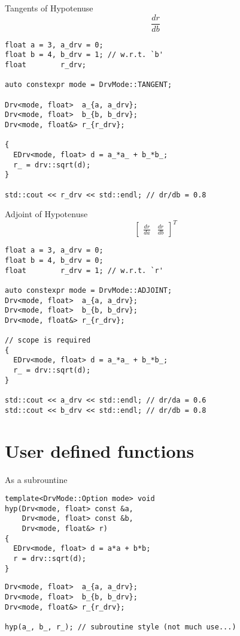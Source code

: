 \documentclass[xcolor=dvipsnames]{beamer}
\begin{document}
\begin{frame}[fragile]{Tangents of Hypotenuse}
\begin{equation*}
  \frac{d r}{d b}
\end{equation*}

\begin{lstlisting}
float a = 3, a_drv = 0;
float b = 4, b_drv = 1; // w.r.t. `b'
float        r_drv;

auto constexpr mode = DrvMode::TANGENT;

Drv<mode, float>  a_{a, a_drv};
Drv<mode, float>  b_{b, b_drv};
Drv<mode, float&> r_{r_drv};

{
  EDrv<mode, float> d = a_*a_ + b_*b_;
  r_ = drv::sqrt(d);
}

std::cout << r_drv << std::endl; // dr/db = 0.8
\end{lstlisting}
\end{frame}


\begin{frame}[fragile]{Adjoint of Hypotenuse}
\begin{equation*}
\begin{bmatrix}
\frac{d r}{d a} & \frac{d r}{d b}
\end{bmatrix}^T
\end{equation*}

\begin{lstlisting}
float a = 3, a_drv = 0;
float b = 4, b_drv = 0;
float        r_drv = 1; // w.r.t. `r'

auto constexpr mode = DrvMode::ADJOINT;
Drv<mode, float>  a_{a, a_drv};
Drv<mode, float>  b_{b, b_drv};
Drv<mode, float&> r_{r_drv};

// scope is required
{
  EDrv<mode, float> d = a_*a_ + b_*b_;
  r_ = drv::sqrt(d);
}

std::cout << a_drv << std::endl; // dr/da = 0.6
std::cout << b_drv << std::endl; // dr/db = 0.8
\end{lstlisting}
\end{frame}


\section{User defined functions}


\begin{frame}[fragile]{As a subrountine}
\begin{lstlisting}
template<DrvMode::Option mode> void
hyp(Drv<mode, float> const &a,
    Drv<mode, float> const &b,
    Drv<mode, float&> r)
{
  EDrv<mode, float> d = a*a + b*b;
  r = drv::sqrt(d);
}
\end{lstlisting}

\begin{lstlisting}
Drv<mode, float>  a_{a, a_drv};
Drv<mode, float>  b_{b, b_drv};
Drv<mode, float&> r_{r_drv};

hyp(a_, b_, r_); // subroutine style (not much use...)
\end{lstlisting}
\end{frame}
\end{document}
